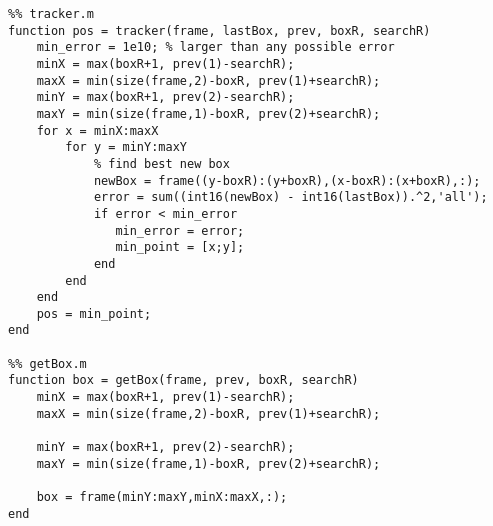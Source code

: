 \documentclass[a4paper,10 pt]{article}
\begin{document}
\begin{lstlisting}
%% tracker.m
function pos = tracker(frame, lastBox, prev, boxR, searchR)
    min_error = 1e10; % larger than any possible error
    minX = max(boxR+1, prev(1)-searchR);
    maxX = min(size(frame,2)-boxR, prev(1)+searchR);
    minY = max(boxR+1, prev(2)-searchR);
    maxY = min(size(frame,1)-boxR, prev(2)+searchR);
    for x = minX:maxX
        for y = minY:maxY
            % find best new box
            newBox = frame((y-boxR):(y+boxR),(x-boxR):(x+boxR),:);
            error = sum((int16(newBox) - int16(lastBox)).^2,'all');
            if error < min_error
               min_error = error;
               min_point = [x;y];
            end
        end
    end
    pos = min_point;
end

%% getBox.m
function box = getBox(frame, prev, boxR, searchR)
    minX = max(boxR+1, prev(1)-searchR);
    maxX = min(size(frame,2)-boxR, prev(1)+searchR);
    
    minY = max(boxR+1, prev(2)-searchR);
    maxY = min(size(frame,1)-boxR, prev(2)+searchR);
    
    box = frame(minY:maxY,minX:maxX,:);
end
\end{lstlisting}
\end{document}
